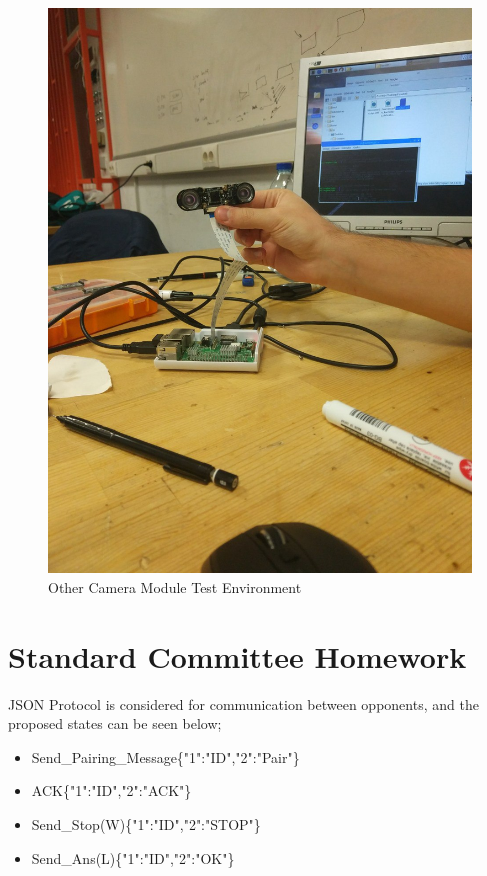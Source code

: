 \documentclass[a4paper,12pt]{article}
\begin{document}
\begin{appendices}
	\begin{figure}[H]
		\centering
		\setlength{\unitlength}{\textwidth} 
		\includegraphics[width=\textwidth,]{cam2}
		\caption{\label{fig:cam2} Other Camera Module Test Environment }
	\end{figure}


\section{Standard Committee Homework}

	JSON Protocol is considered for communication between opponents, and the proposed states can be seen below;
	\begin{itemize}
		\item Send\_Pairing\_Message\{"1":"ID","2":"Pair"\}		
		\item ACK\{"1":"ID","2":"ACK"\}
		\item Send\_Stop(W)\{"1":"ID","2":"STOP"\}
		\item Send\_Ans(L)\{"1":"ID","2":"OK"\}

	\end{itemize}



\end{appendices}
\end{document}
